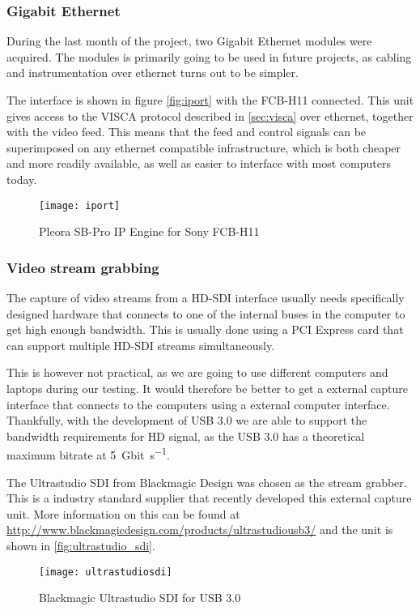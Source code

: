 \subsubsection{Gigabit Ethernet}\label{sec:hw.gige}
During the last month of the project, two Gigabit Ethernet modules were acquired. The modules is primarily 
going to be used in future projects, as cabling and instrumentation over ethernet turns out to be simpler. 

The interface is shown in figure \vref{fig:iport} with the FCB-H11 connected. This unit gives access to the VISCA protocol described 
in \vref{sec:visca} over ethernet, together with the video feed. This means that the feed and control signals can be superimposed 
on any ethernet compatible infrastructure, which is both cheaper and more readily available, as well as easier 
to interface with most computers today.

\begin{figure}[htbp]
	\centering
	\texttt{[image: iport]}
	\caption{Pleora SB-Pro IP Engine for Sony FCB-H11}
	\label{fig:iport}
\end{figure}

\subsubsection{Video stream grabbing}
The capture of video streams from a HD-SDI interface usually needs specifically designed hardware that 
connects to one of the internal buses in the computer to get high enough bandwidth. This is usually 
done using a PCI Express card that can support multiple HD-SDI streams simultaneously. 

This is however not practical, as we are going to use different computers and laptops during our testing. 
It would therefore be better to get a external capture interface that connects to the computers using a 
external computer interface. Thankfully, with the development of USB 3.0 we are able 
to support the bandwidth requirements for HD signal, as the USB 3.0 has a theoretical maximum bitrate 
at \SI{5}{\giga bit\per\second}.

The Ultrastudio SDI from Blackmagic Design was chosen as the stream grabber. This is a industry standard 
supplier that recently developed this external capture unit. More information on this can be found at 
\url{http://www.blackmagicdesign.com/products/ultrastudiousb3/} and the unit is shown in \vref{fig:ultrastudio_sdi}.

\begin{figure}[htbp]
	\centering
	\texttt{[image: ultrastudiosdi]}
	\caption{Blackmagic Ultrastudio SDI for USB 3.0}
	\label{fig:ultrastudio_sdi}
\end{figure}

